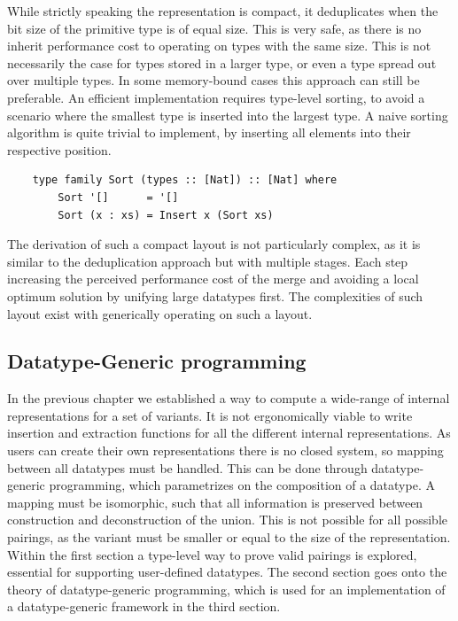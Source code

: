 \documentclass{article}
\begin{document}
While strictly speaking the representation is compact, it deduplicates when the bit size of the primitive type is of equal size.
This is very safe, as there is no inherit performance cost to operating on types with the same size.
This is not necessarily the case for types stored in a larger type, or even a type spread out over multiple types.
In some memory-bound cases this approach can still be preferable.
An efficient implementation requires type-level sorting, to avoid a scenario where the smallest type is inserted into the largest type.
A naive sorting algorithm is quite trivial to implement, by inserting all elements into their respective position. 

\begin{verbatim}
    type family Sort (types :: [Nat]) :: [Nat] where
        Sort '[]      = '[]
        Sort (x : xs) = Insert x (Sort xs)
\end{verbatim}

The derivation of such a compact layout is not particularly complex, as it is similar to the deduplication approach but with multiple stages.
Each step increasing the perceived performance cost of the merge and avoiding a local optimum solution by unifying large datatypes first. 
The complexities of such layout exist with generically operating on such a layout. 

\newpage

\subsection{Datatype-Generic programming}

In the previous chapter we established a way to compute a wide-range of internal representations for a set of variants.
It is not ergonomically viable to write insertion and extraction functions for all the different internal representations. 
As users can create their own representations there is no closed system, so mapping between all datatypes must be handled.
This can be done through datatype-generic programming, which parametrizes on the composition of a datatype\cite{datatype-generic-programming}. 
A mapping must be isomorphic, such that all information is preserved between construction and deconstruction of the union.
This is not possible for all possible pairings, as the variant must be smaller or equal to the size of the representation.
Within the first section a type-level way to prove valid pairings is explored, essential for supporting user-defined datatypes.
The second section goes onto the theory of datatype-generic programming, which is used for an implementation of a datatype-generic framework in the third section.
\end{document}
